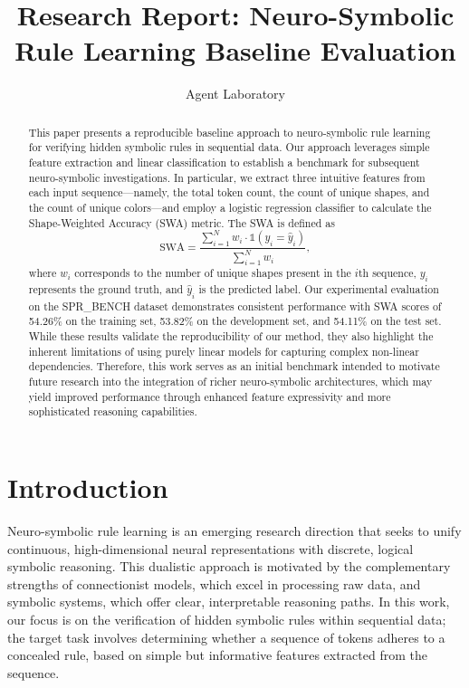 \documentclass{article}
\title{Research Report: Neuro-Symbolic Rule Learning Baseline Evaluation}
\author{Agent Laboratory}
\date{}
\begin{document}
\maketitle

\begin{abstract}
This paper presents a reproducible baseline approach to neuro-symbolic rule learning for verifying hidden symbolic rules in sequential data. Our approach leverages simple feature extraction and linear classification to establish a benchmark for subsequent neuro-symbolic investigations. In particular, we extract three intuitive features from each input sequence—namely, the total token count, the count of unique shapes, and the count of unique colors—and employ a logistic regression classifier to calculate the Shape-Weighted Accuracy (SWA) metric. The SWA is defined as 
\[
\text{SWA} = \frac{\sum_{i=1}^{N} w_i \cdot \mathbb{1}(y_i = \hat{y}_i)}{\sum_{i=1}^{N} w_i},
\]
where \(w_i\) corresponds to the number of unique shapes present in the \(i\)th sequence, \(y_i\) represents the ground truth, and \(\hat{y}_i\) is the predicted label. Our experimental evaluation on the SPR\_BENCH dataset demonstrates consistent performance with SWA scores of 54.26\% on the training set, 53.82\% on the development set, and 54.11\% on the test set. While these results validate the reproducibility of our method, they also highlight the inherent limitations of using purely linear models for capturing complex non-linear dependencies. Therefore, this work serves as an initial benchmark intended to motivate future research into the integration of richer neuro-symbolic architectures, which may yield improved performance through enhanced feature expressivity and more sophisticated reasoning capabilities.
\end{abstract}

\section{Introduction}
Neuro-symbolic rule learning is an emerging research direction that seeks to unify continuous, high-dimensional neural representations with discrete, logical symbolic reasoning. This dualistic approach is motivated by the complementary strengths of connectionist models, which excel in processing raw data, and symbolic systems, which offer clear, interpretable reasoning paths. In this work, our focus is on the verification of hidden symbolic rules within sequential data; the target task involves determining whether a sequence of tokens adheres to a concealed rule, based on simple but informative features extracted from the sequence. 
\end{document}
